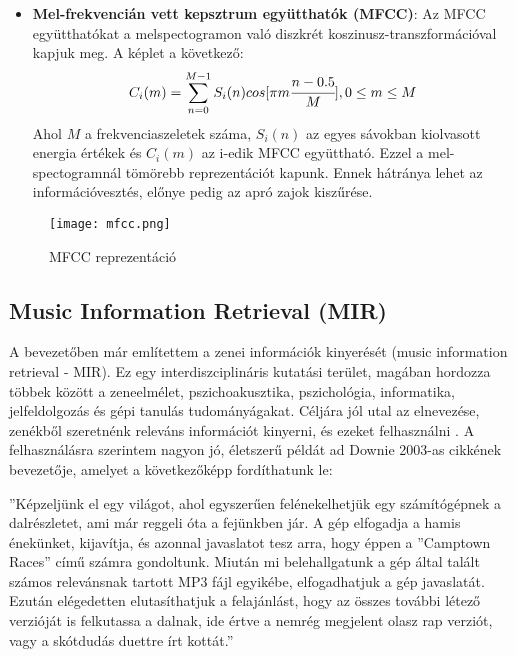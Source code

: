 \begin{itemize}
\item \textbf{Mel-frekvencián vett kepsztrum együtthatók (MFCC)}: Az MFCC együtthatókat a melspectogramon való diszkrét koszinusz-transzformációval kapjuk meg. A képlet a következő:
\begin{equation}
	C_i(m) =  \sum_{n=0}^{M-1}S_i(n) cos [\pi m\cfrac{n - 0.5}{M}], 0 \leq m \leq M
\end{equation}
Ahol \(M\) a frekvenciaszeletek száma, \(S_i(n)\) az egyes sávokban kiolvasott energia értékek és \(C_i(m)\) az i-edik MFCC együttható. Ezzel a mel-spectogramnál tömörebb reprezentációt kapunk. Ennek hátránya lehet az információvesztés, előnye pedig az apró zajok kiszűrése. \cite{bhalke2015}
\end{itemize}

\begin{figure}[H]
  \centering
  \texttt{[image: mfcc.png]}
  \caption{MFCC reprezentáció \cite{librosa}}
\end{figure}

\subsection{Music Information Retrieval (MIR)} 

A bevezetőben már említettem a zenei információk kinyerését (music information retrieval - MIR). Ez egy interdiszciplináris kutatási terület, magában hordozza többek között a zeneelmélet, pszichoakusztika, pszichológia, informatika, jelfeldolgozás és gépi tanulás tudományágakat. Céljára jól utal az elnevezése, zenékből szeretnénk releváns információt kinyerni, és ezeket felhasználni \cite{Choi2017}. A felhasználásra szerintem nagyon jó, életszerű példát ad Downie 2003-as cikkének \cite{Downie2003} bevezetője, amelyet a következőképp fordíthatunk le:

''Képzeljünk el egy világot, ahol egyszerűen felénekelhetjük egy számítógépnek a dalrészletet, ami már reggeli óta a fejünkben jár. A gép elfogadja a hamis énekünket, kijavítja, és azonnal javaslatot tesz arra, hogy éppen a ''Camptown Races'' című számra gondoltunk. Miután mi belehallgatunk a gép által talált számos relevánsnak tartott MP3 fájl egyikébe, elfogadhatjuk a gép javaslatát. Ezután elégedetten elutasíthatjuk a felajánlást, hogy az összes további létező verzióját is felkutassa a dalnak, ide értve a nemrég megjelent olasz rap verziót, vagy a skótdudás duettre írt kottát.''  \cite{Downie2003}

